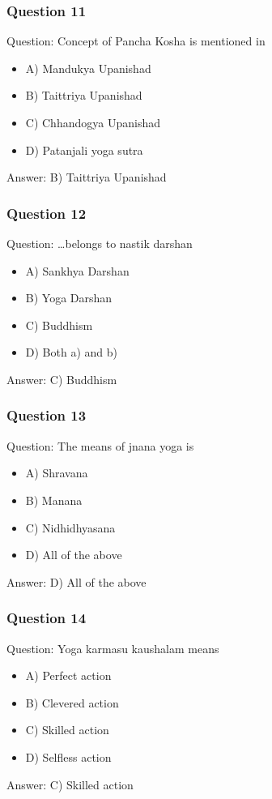 \begin{frame}[fragile]\frametitle{Question 11}
Question: Concept of Pancha Kosha is mentioned in
\begin{itemize}
\item A) Mandukya Upanishad
\item B) Taittriya Upanishad
\item C) Chhandogya Upanishad
\item D) Patanjali yoga sutra
\end{itemize}
Answer: B) Taittriya Upanishad
\end{frame}

\begin{frame}[fragile]\frametitle{Question 12}
Question: \ldots belongs to nastik darshan
\begin{itemize}
\item A) Sankhya Darshan
\item B) Yoga Darshan
\item C) Buddhism
\item D) Both a) and b)
\end{itemize}
Answer: C) Buddhism
\end{frame}

\begin{frame}[fragile]\frametitle{Question 13}
Question: The means of jnana yoga is
\begin{itemize}
\item A) Shravana
\item B) Manana
\item C) Nidhidhyasana
\item D) All of the above
\end{itemize}
Answer: D) All of the above
\end{frame}

\begin{frame}[fragile]\frametitle{Question 14}
Question: Yoga karmasu kaushalam means
\begin{itemize}
\item A) Perfect action
\item B) Clevered action
\item C) Skilled action
\item D) Selfless action
\end{itemize}
Answer: C) Skilled action
\end{frame}

